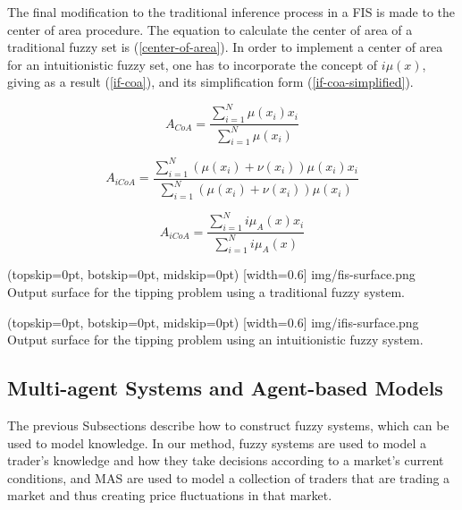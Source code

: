 \documentclass{ieeeaccess}
\begin{document}
The final modification to the traditional inference process in a FIS is made to
the center of area procedure. The equation to calculate the center of area of a
traditional fuzzy set is (\ref{center-of-area}). In order to implement a center
of area for an intuitionistic fuzzy set, one has to incorporate the concept of
$i\mu(x)$, giving as a result (\ref{if-coa}), and its simplification form
(\ref{if-coa-simplified}).

\begin{equation}
  \label{center-of-area}
  A_{CoA} = \dfrac{\sum_{i=1}^{N} \mu(x_{i})
    x_{i}}{\sum_{i=1}^{N} \mu(x_{i})}
\end{equation}

\begin{equation}
  \label{if-coa}
  A_{iCoA} = \dfrac{\sum_{i=1}^{N} (\mu(x_{i}) + \nu(x_{i})) \mu(x_{i})
    x_{i}}{\sum_{i=1}^{N} (\mu(x_{i}) + \nu(x_{i})) \mu(x_{i})}
\end{equation}

\begin{equation}
  \label{if-coa-simplified}
  A_{iCoA} = \dfrac{\sum_{i=1}^{N} i\mu_{A}(x) x_{i}}{\sum_{i=1}^{N}
    i\mu_{A}(x)}
\end{equation}

\Figure[](topskip=0pt, botskip=0pt, midskip=0pt)
[width=0.6\linewidth]
{img/fis-surface.png}
{Output surface for the tipping problem using a traditional fuzzy system.
  \label{figure:tipping-output-surface}}

\Figure[](topskip=0pt, botskip=0pt, midskip=0pt)
[width=0.6\linewidth]
{img/ifis-surface.png}
{Output surface for the tipping problem using an intuitionistic fuzzy system.
  \label{figure:ifis-tipping-output-surface}}

\subsection{Multi-agent Systems and Agent-based Models}
\label{subsection:multi-agent-system}


The previous Subsections describe how to construct fuzzy systems,
which can be used to model knowledge. In our method, fuzzy systems are
used to model a trader's knowledge and how they take decisions
according to a market's current conditions, and MAS are used to model
a collection of traders that are trading a market and thus creating
price fluctuations in that market.
\end{document}

